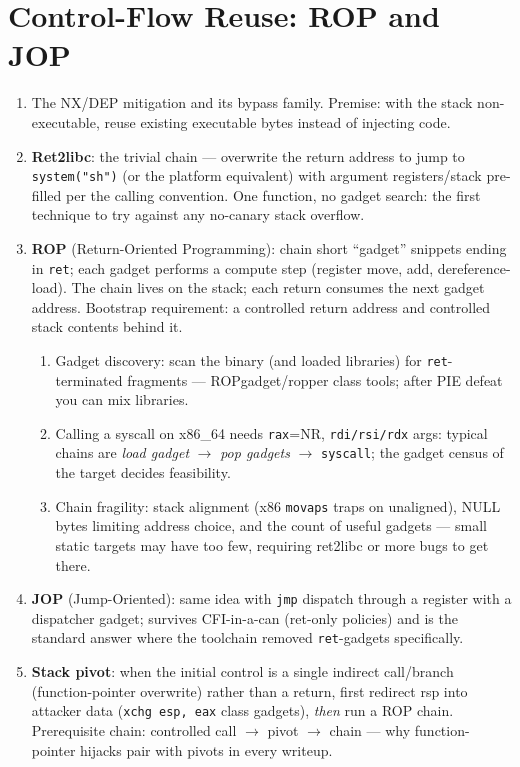\documentclass[12pt]{Training}
\begin{document}
\section*{Control-Flow Reuse: ROP and JOP}
\begin{enumerate}
    \item The NX/DEP mitigation and its bypass family. Premise: with the stack non-executable, reuse existing executable bytes instead of injecting code.
    \item \textbf{Ret2libc}: the trivial chain --- overwrite the return address to jump to \lstinline{system("sh")} (or the platform equivalent) with argument registers/stack pre-filled per the calling convention. One function, no gadget search: the first technique to try against any no-canary stack overflow.
    \item \textbf{ROP} (Return-Oriented Programming): chain short ``gadget'' snippets ending in \lstinline{ret}; each gadget performs a compute step (register move, add, dereference-load). The chain lives on the stack; each return consumes the next gadget address. Bootstrap requirement: a controlled return address and controlled stack contents behind it.
    \begin{enumerate}
        \item Gadget discovery: scan the binary (and loaded libraries) for \lstinline{ret}-terminated fragments --- ROPgadget/ropper class tools; after PIE defeat you can mix libraries.
        \item Calling a syscall on x86\_64 needs \lstinline{rax}=NR, \lstinline{rdi/rsi/rdx} args: typical chains are \emph{load gadget} $\to$ \emph{pop gadgets} $\to$ \lstinline{syscall}; the gadget census of the target decides feasibility.
        \item Chain fragility: stack alignment (x86 \lstinline{movaps} traps on unaligned), NULL bytes limiting address choice, and the count of useful gadgets --- small static targets may have too few, requiring ret2libc or more bugs to get there.
    \end{enumerate}
    \item \textbf{JOP} (Jump-Oriented): same idea with \lstinline{jmp} dispatch through a register with a dispatcher gadget; survives CFI-in-a-can (ret-only policies) and is the standard answer where the toolchain removed \lstinline{ret}-gadgets specifically.
    \item \textbf{Stack pivot}: when the initial control is a single indirect call/branch (function-pointer overwrite) rather than a return, first redirect rsp into attacker data (\lstinline{xchg esp, eax} class gadgets), \emph{then} run a ROP chain. Prerequisite chain: controlled call $\to$ pivot $\to$ chain --- why function-pointer hijacks pair with pivots in every writeup.

\end{enumerate}
\end{document}
